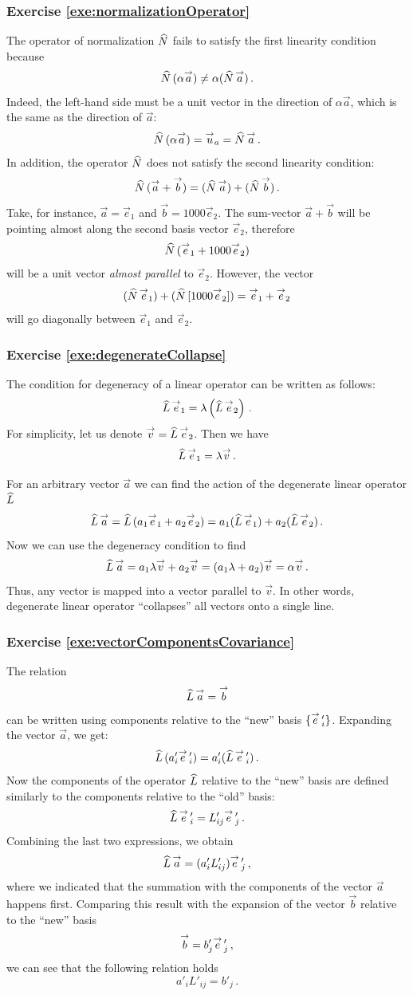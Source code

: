 \subsubsection*{Exercise \ref{exe:normalizationOperator}}
The operator of normalization $\widehat{N}$ fails to satisfy the first
linearity condition because
\[
\widehat{N}\,(\alpha \overset{\rightarrow}{a}) \ne \alpha (\widehat{N}\,\overset{\rightarrow}{a})\,.
\]
Indeed, the left-hand side must be a unit vector in the direction of
$\alpha\vec{a}$, which is the same as the direction of $\vec{a}$:
\[
\widehat{N}\,(\alpha \overset{\rightarrow}{a}) = \overset{\rightarrow}{u}_a = \widehat{N}\,\overset{\rightarrow}{a}\,.
\]
In addition, the operator $\widehat{N}$ does not satisfy the second
linearity condition:
\[
\widehat{N}\,(\overset{\rightarrow}{a}+\overset{\rightarrow}{b}) = (\widehat{N}\,\overset{\rightarrow}{a}) + (\widehat{N}\,\overset{\rightarrow}{b})\,.
\]
Take, for instance, $\vec{a}=\vec{e}_1$ and
$\vec{b}=1000\vec{e}_2$. The sum-vector $\vec{a}+\vec{b}$ will be
pointing almost along the second basis vector $\vec{e}_2$, therefore
\[
\widehat{N}\,(\overset{\rightarrow}{e}_1+1000\overset{\rightarrow}{e}_2)
\]
will be a unit vector \emph{almost parallel} to $\vec{e}_2$. However,
the vector
\[
(\widehat{N}\,\overset{\rightarrow}{e}_1) + (\widehat{N}\,[1000\overset{\rightarrow}{e}_2]) = \overset{\rightarrow}{e}_1 + \overset{\rightarrow}{e}_2
\]
will go diagonally between $\vec{e}_1$ and $\vec{e}_2$.


\subsubsection*{Exercise \ref{exe:degenerateCollapse}}
The condition for degeneracy of a linear operator can be written as follows:
\[
\widehat{L}\,\overset{\rightarrow}{e}_1 = \lambda\left(\widehat{L}\,\overset{\rightarrow}{e}_2\right)\,.
\]
For simplicity, let us denote $\overset{\rightarrow}{v} = \widehat{L}\,\overset{\rightarrow}{e}_2$. Then we
have
\[
\widehat{L}\,\overset{\rightarrow}{e}_1 = \lambda \overset{\rightarrow}{v}\,.
\]

For an arbitrary vector $\vec{a}$ we can find the action of the
degenerate linear operator $\widehat{L}$
\[
\widehat{L}\,\overset{\rightarrow}{a} = \widehat{L}\,(a_1\overset{\rightarrow}{e}_1 + a_2\overset{\rightarrow}{e}_2) = a_1
(\widehat{L}\,\overset{\rightarrow}{e}_1) + a_2(\widehat{L}\,\overset{\rightarrow}{e}_2)\,.
\]
Now we can use the degeneracy condition to find
\[
\widehat{L}\,\overset{\rightarrow}{a} = a_1\lambda \overset{\rightarrow}{v}+a_2\overset{\rightarrow}{v} = (a_1\lambda +
a_2)\overset{\rightarrow}{v}=\alpha \overset{\rightarrow}{v}\,.
\]
Thus, any vector is mapped into a vector parallel to $\vec{v}$. In
other words, degenerate linear operator ``collapses'' all vectors onto
a single line.


\subsubsection*{Exercise \ref{exe:vectorComponentsCovariance}}
The relation
\[
\widehat{L}\,\overset{\rightarrow}{a} = \overset{\rightarrow}{b}
\]
can be written using components relative to the ``new'' basis
$\lbrace \overset{\rightarrow}{e}\,'_i\rbrace$. Expanding the vector $\vec{a}$, we get:
\[
\widehat{L}\,(a'_i\overset{\rightarrow}{e}\,'_i) = a'_i(\widehat{L}\,\overset{\rightarrow}{e}\,'_i)\,.
\]
Now the components of the operator $\widehat{L}$ relative to the ``new''
basis are defined similarly to the components relative to the ``old''
basis:
\[
\widehat{L}\,\overset{\rightarrow}{e}\,'_i = L'_{ij}\overset{\rightarrow}{e}\,'_j\,.
\]
Combining the last two expressions, we obtain
\[
\widehat{L}\,\overset{\rightarrow}{a} = (a'_iL'_{ij})\overset{\rightarrow}{e}\,'_j\,,
\]
where we indicated that the summation with the components of the
vector $\vec{a}$ happens first. Comparing this result with the
expansion of the vector $\vec{b}$ relative to the ``new'' basis
\[
\overset{\rightarrow}{b} = b'_j\overset{\rightarrow}{e}\,'_j\,,
\]
we can see that the following relation holds
\[
a'_iL'_{ij} = b'_j\,.
\]


